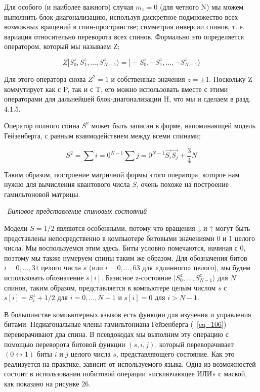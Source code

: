 \documentclass[11pt]{article}
\begin{document}
Для особого (и наиболее важного) случая $m_z = 0$ (для четного N) мы можем выполнить блок-диагонализацию, используя дискретное подмножество всех возможных вращений в спин-пространстве; симметрия инверсии спинов, т. е. вариация относительно переворота всех спинов. Формально это определяется оператором, который мы называем Z;

\begin{equation}
Z|S_0^z, S_1^z,\dots,S_{N-1}^z\rangle = |-S_{0}^z, -S_1^z, \dots, -S_{N-1}^z\rangle
\label{eq_112}
\end{equation}

Для этого оператора снова $Z^2 = 1$ и собственные значения $z = \pm 1$. Поскольку Z коммутирует как с P, так и с T, его можно использовать вместе с этими операторами для дальнейшей блок-диагонализации H, что мы и сделаем в разд. 4.1.5.

Оператор полного спина $S^2$ может быть записан в форме, напоминающей модель Гейзенберга, с равным взаимодействием между всеми спинами;

\begin{equation}
S^2=\sum\limits{i=0}^{N-1}\sum\limits{j=0}^{N-1}\vec{S_i}\vec{S_j}+\frac{3}{4}N
\label{eq_113}
\end{equation}

Таким образом, построение матричной формы этого оператора, которое нам нужно для вычисления квантового числа $S$, очень похоже на построение гамильтоновой матрицы.

~\emph{Битовое представление спиновых состояний}

Модели $S = 1/2$ являются особенными, потому что вращения ↓ и ↑ могут быть представлены непосредственно в компьютере битовыми значениями 0 и 1 целого числа. Мы воспользуемся этим здесь. Биты условно помечаются, начиная с 0, поэтому мы также нумеруем спины таким же образом. Для обозначения битов $i = 0,\dots, 31$ целого числа $s$ (или $i = 0,\dots, 63$ для «длинного» целого), мы будем использовать обозначение $s[i]$. Базисное z-состояние $| S_0^z,\dots , S_{N − 1}^z \rangle $ для $N$ спинов, таким образом, представляется в компьютере целым числом $s$ с $s[i] = S_i^z + 1/2$ для $i = 0,\dots, N - 1$ и $s[i] = 0$ для $i> N - 1$.

В большинстве компьютерных языков есть функции для изучения и управления битами. Недиагональные члены гамильтониана Гейзенберга (~\ref{eq_106}) переворачивают два спина. В псевдокодах мы выполним эту операцию с помощью переворота битовой функции $(s, i, j)$, который переворачивает $(0 \leftrightarrow 1)$ биты $i$ и $j$ целого числа $s$, представляющего состояние. Как это реализуется на практике, зависит от используемого языка. Одна из возможностей состоит в использовании побитовой операции «исключающее ИЛИ» с маской, как показано на рисунке 26. 
\end{document}
